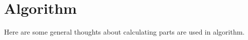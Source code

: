 \chapter{Algorithm}
Here are some general thoughts about calculating parts are used in algorithm.




